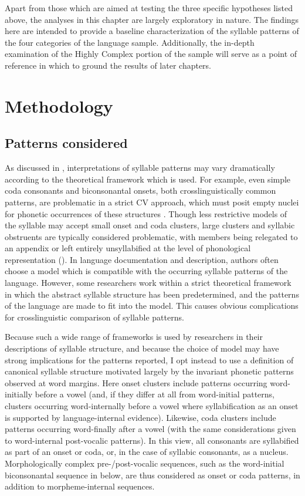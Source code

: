   Apart from those which are aimed at testing the three specific hypotheses listed above, the analyses in this chapter are largely exploratory in nature. The findings here are intended to provide a baseline characterization of the syllable patterns of the four categories of the language sample. Additionally, the in-depth examination of the Highly Complex portion of the sample will serve as a point of reference in which to ground the results of later chapters.

\section{Methodology} \label{sec:3.2}
\subsection{Patterns considered}\label{sec:3.2.1}

  As discussed in , interpretations of syllable patterns may vary dramatically according to the theoretical framework which is used. For example, even simple coda consonants and biconsonantal onsets, both crosslinguistically common patterns, are problematic in a strict CV approach, which must posit empty nuclei for phonetic occurrences of these structures \citep{Lowenstamm1996}. Though less restrictive models of the syllable may accept small onset and coda clusters, large clusters and syllabic obstruents are typically considered problematic, with members being relegated to an appendix or left entirely unsyllabified at the level of phonological representation (\citealt{VauxWolfe2009,Bagemihl1991}). In language documentation and description, authors often choose a model which is compatible with the occurring syllable patterns of the language. However, some researchers work within a strict theoretical framework in which the abstract syllable structure has been predetermined, and the patterns of the language are made to fit into the model. This causes obvious complications for crosslinguistic comparison of syllable patterns.

  Because such a wide range of frameworks is used by researchers in their descriptions of syllable structure, and because the choice of model may have strong implications for the patterns reported, I opt instead to use a definition of canonical syllable structure motivated largely by the invariant phonetic patterns observed at word margins. Here onset clusters include patterns occurring word-initially before a vowel (and, if they differ at all from word-initial patterns, clusters occurring word-internally before a vowel where syllabification as an onset is supported by language-internal evidence). Likewise, coda clusters include patterns occurring word-finally after a vowel (with the same considerations given to word-internal post-vocalic patterns). In this view, all consonants are syllabified as part of an onset or coda, or, in the case of syllabic consonants, as a nucleus. Morphologically complex pre-/post-vocalic sequences, such as the word-initial biconsonantal sequence in  below, are thus considered as onset or coda patterns, in addition to morpheme-internal sequences.


